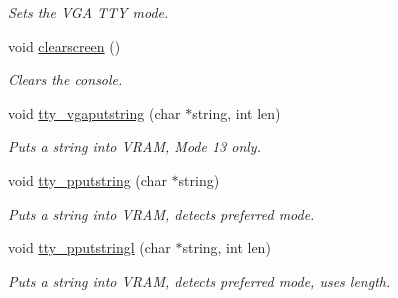 \begin{DoxyCompactItemize}
\begin{DoxyCompactList}\small\item\em Sets the V\+GA T\+TY mode. \end{DoxyCompactList}\item 
void \hyperlink{a00167_aff4bc17c602603d120756f52e18ebb96_aff4bc17c602603d120756f52e18ebb96}{clearscreen} ()
\begin{DoxyCompactList}\small\item\em Clears the console. \end{DoxyCompactList}\item 
void \hyperlink{a00167_a05ca3f5e64f38fec173b635ca8465415_a05ca3f5e64f38fec173b635ca8465415}{tty\+\_\+vgaputstring} (char $\ast$string, int len)
\begin{DoxyCompactList}\small\item\em Puts a string into V\+R\+AM, Mode 13 only. \end{DoxyCompactList}\item 
void \hyperlink{a00167_ade960b1320324706aac6c00cc6b1b2fe_ade960b1320324706aac6c00cc6b1b2fe}{tty\+\_\+pputstring} (char $\ast$string)
\begin{DoxyCompactList}\small\item\em Puts a string into V\+R\+AM, detects preferred mode. \end{DoxyCompactList}\item 
void \hyperlink{a00167_abaf93f9e56ddb7b10462070f59e534e4_abaf93f9e56ddb7b10462070f59e534e4}{tty\+\_\+pputstringl} (char $\ast$string, int len)
\begin{DoxyCompactList}\small\item\em Puts a string into V\+R\+AM, detects preferred mode, uses length. \end{DoxyCompactList}\end{DoxyCompactItemize}
